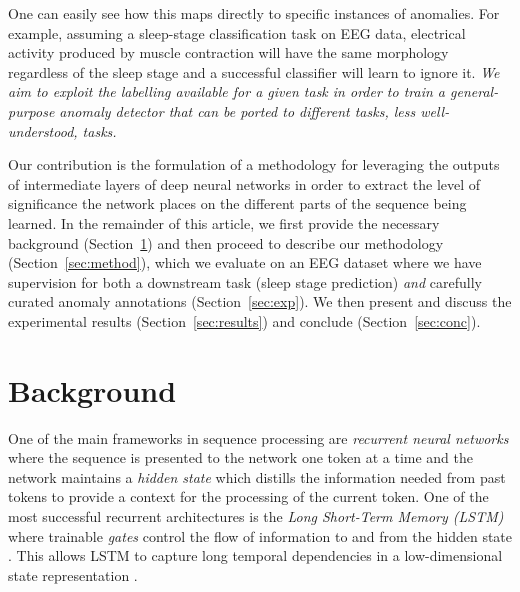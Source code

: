 \documentclass[runningheads]{llncs}
\begin{document}
One can easily see how this maps directly to specific instances of
anomalies. For example, assuming a sleep-stage classification task on
EEG data, electrical activity produced by muscle contraction will
have the same morphology regardless of the sleep stage and a
successful classifier will learn to ignore it.
\emph{We aim to exploit the labelling available for a given task
in order to train a general-purpose anomaly detector that can be
ported to different tasks, less well-understood, tasks.}

Our contribution is the formulation of a methodology for leveraging
the outputs of intermediate layers of deep neural networks in order
to extract the level of significance the network places on the
different parts of the sequence being learned. In the remainder of
this article, we first provide the necessary background
(Section~\ref{sec:bg}) and then proceed to describe our
methodology (Section~\ref{sec:method}), which we evaluate on
an EEG dataset where we have supervision for both a downstream task
(sleep stage prediction) \emph{and} carefully curated anomaly
annotations (Section~\ref{sec:exp}). We then present and discuss
the experimental results (Section~\ref{sec:results}) and conclude
(Section~\ref{sec:conc}).



\section{Background}
\label{sec:bg}


One of the main frameworks in sequence processing are
\emph{recurrent neural networks} where the sequence is presented to
the network one token at a time and the network maintains a
\emph{hidden state} which distills the information needed from past
tokens to provide a context for the processing of the current token.
One of the most successful recurrent architectures is the
\emph{Long Short-Term Memory (LSTM)} where trainable \emph{gates}
control the flow of information to and from the hidden state
\cite{hochreiter-schmidhuber:1997}. This allows LSTM to capture long
temporal dependencies in a low-dimensional state representation
\cite{HOJJATI2024106106,10744017}.
\end{document}
